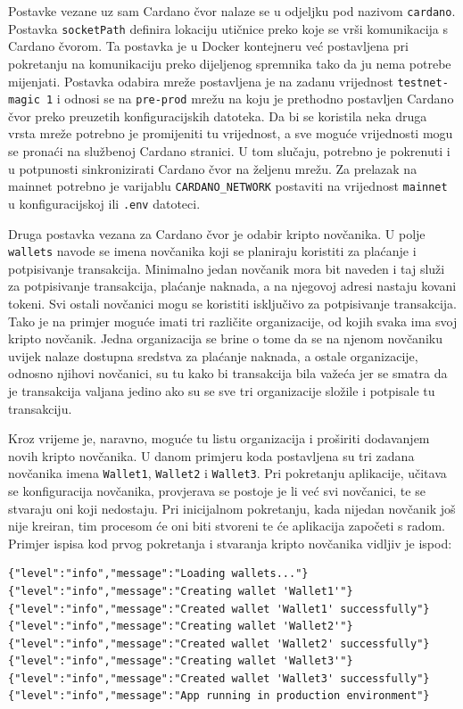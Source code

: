 \documentclass[times, utf8, diplomski]{fer}
\begin{document}
Postavke vezane uz sam Cardano čvor nalaze se u odjeljku pod nazivom \texttt{cardano}. Postavka \texttt{socketPath} definira lokaciju utičnice preko koje se vrši komunikacija s Cardano čvorom. Ta postavka je u Docker kontejneru već postavljena pri pokretanju na komunikaciju preko dijeljenog spremnika tako da ju nema potrebe mijenjati. Postavka odabira mreže postavljena je na zadanu vrijednost \texttt{testnet-magic 1} i odnosi se na \texttt{pre-prod} mrežu na koju je prethodno postavljen Cardano čvor preko preuzetih konfiguracijskih datoteka. Da bi se koristila neka druga vrsta mreže potrebno je promijeniti tu vrijednost, a sve moguće vrijednosti mogu se pronaći na službenoj Cardano stranici. U tom slučaju, potrebno je pokrenuti i u potpunosti sinkronizirati Cardano čvor na željenu mrežu. Za prelazak na mainnet potrebno je varijablu \texttt{CARDANO\_NETWORK} postaviti na vrijednost \texttt{mainnet} u konfiguracijskoj ili \texttt{.env} datoteci.

Druga postavka vezana za Cardano čvor je odabir kripto novčanika. U polje \texttt{wallets} navode se imena novčanika koji se planiraju koristiti za plaćanje i potpisivanje transakcija. Minimalno jedan novčanik mora bit naveden i taj služi za potpisivanje transakcija, plaćanje naknada, a na njegovoj adresi nastaju kovani tokeni. Svi ostali novčanici mogu se koristiti isključivo za potpisivanje transakcija. Tako je na primjer moguće imati tri različite organizacije, od kojih svaka ima svoj kripto novčanik. Jedna organizacija se brine o tome da se na njenom novčaniku uvijek nalaze dostupna sredstva za plaćanje naknada, a ostale organizacije, odnosno njihovi novčanici, su tu kako bi transakcija bila važeća jer se smatra da je transakcija valjana jedino ako su se sve tri organizacije složile i potpisale tu transakciju. 

Kroz vrijeme je, naravno, moguće tu listu organizacija i proširiti dodavanjem novih kripto novčanika. U danom primjeru koda postavljena su tri zadana novčanika imena \texttt{Wallet1}, \texttt{Wallet2} i \texttt{Wallet3}. Pri pokretanju aplikacije, učitava se konfiguracija novčanika, provjerava se postoje je li već svi novčanici, te se stvaraju oni koji nedostaju. Pri inicijalnom pokretanju, kada nijedan novčanik još nije kreiran, tim procesom će oni biti stvoreni te će aplikacija započeti s radom. Primjer ispisa kod prvog pokretanja i stvaranja kripto novčanika vidljiv je ispod:

\begin{lstlisting}
{"level":"info","message":"Loading wallets..."}
{"level":"info","message":"Creating wallet 'Wallet1'"}
{"level":"info","message":"Created wallet 'Wallet1' successfully"}
{"level":"info","message":"Creating wallet 'Wallet2'"}
{"level":"info","message":"Created wallet 'Wallet2' successfully"}
{"level":"info","message":"Creating wallet 'Wallet3'"}
{"level":"info","message":"Created wallet 'Wallet3' successfully"}
{"level":"info","message":"App running in production environment"}
\end{lstlisting}
\end{document}
